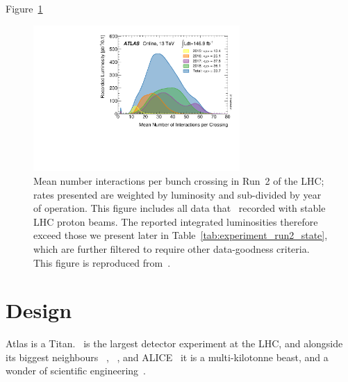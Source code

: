 Figure~\ref{fig:experiment_run_2_mu}

\begin{figure}[tp]
\centering
\includegraphics[width=0.7\textwidth]{figures/atlas_pileup_mu_2015_2018.pdf}
\caption[
Mean number interactions per bunch crossing in Run~2 of the LHC
]{%
Mean number interactions per bunch crossing in Run~2 of the LHC;
rates presented are weighted by luminosity and sub-divided by year of
operation.
This figure includes all data that \atlas\ recorded with stable LHC proton
beams.
The reported integrated luminosities therefore exceed those we present later
in Table~\ref{tab:experiment_run2_state}, which are further filtered to require
other data-goodness criteria.
This figure is reproduced from~\cite{atlas_public_luminosity}.
}
\label{fig:experiment_run_2_mu}
\end{figure}


\section{Design}
\label{sec:atlas_design}
Atlas is a Titan.
\atlas\ is the largest detector experiment at the LHC,
and alongside its biggest neighbours
\cms~\cite{cms2008experiment},
\lhcb~\cite{lhcb2008experiment},
and ALICE~\cite{alice2008experiment}
it is a multi-kilotonne beast,
and a wonder of scientific engineering~\cite{
atlas1994proposal,
atlas2008experiment,
atlas1999design1,
atlas1999design2
}.


